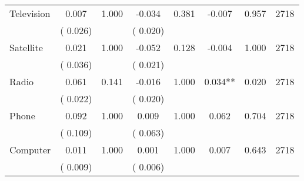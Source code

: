 \begin{tabular}{l*{7}{c}}
 Television       &              0.007       &        1.000  &             -0.034       &        0.381  &             -0.007       &              0.957 &  2718 \\ 
                       &       (       0.026)             &                               &       (       0.020)                     &                               &                                               &                                &                      \\ 

 Satellite       &              0.021       &        1.000  &             -0.052       &        0.128  &             -0.004       &              1.000 &  2718 \\ 
                       &       (       0.036)             &                               &       (       0.021)                     &                               &                                               &                                &                      \\ 

 Radio       &              0.061       &        0.141  &             -0.016       &        1.000  &              0.034**       &              0.020 &  2718 \\ 
                       &       (       0.022)             &                               &       (       0.020)                     &                               &                                               &                                &                      \\ 

 Phone       &              0.092       &        1.000  &              0.009       &        1.000  &              0.062       &              0.704 &  2718 \\ 
                       &       (       0.109)             &                               &       (       0.063)                     &                               &                                               &                                &                      \\ 

 Computer       &              0.011       &        1.000  &              0.001       &        1.000  &              0.007       &              0.643 &  2718 \\ 
                       &       (       0.009)             &                               &       (       0.006)                     &                               &                                               &                                &                      \\ 


\end{tabular}

